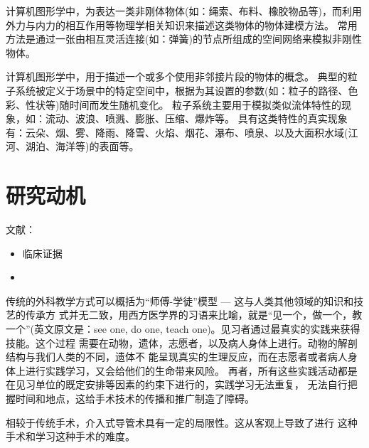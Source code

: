 \begin{definition}[形变模型]
计算机图形学中，为表达一类非刚体物体(如：绳索、布料、橡胶物品等)，而利用外力与内力的相互作用等物理学相关知识来描述这类物体的物体建模方法。
常用方法是通过一张由相互灵活连接(如：弹簧)的节点所组成的空间网络来模拟非刚性物体\cite{Hearn2004CGBook}。
\end{definition}

\begin{definition}[中心线提取]
\end{definition}

\begin{definition}[状态机]
\end{definition}

\begin{definition}[粒子系统]
计算机图形学中，用于描述一个或多个使用非邻接片段的物体的概念。
典型的粒子系统被定义于场景中的特定空间中，根据为其设置的参数(如：粒子的路径、色彩、性状等)随时间而发生随机变化。
粒子系统主要用于模拟类似流体特性的现象，如：流动、波浪、喷溅、膨胀、压缩、爆炸等。
具有这类特性的真实现象有：云朵、烟、雾、降雨、降雪、火焰、烟花、瀑布、喷泉、以及大面积水域(江河、湖泊、海洋等)的表面等\cite{Hearn2004CGBook}。
\end{definition}

\section{研究动机}
\label{sec1-2}

文献：
\begin{itemize}
  \item 临床证据\cite{Aggarwal2006}
  \item
\end{itemize}

传统的外科教学方式可以概括为“师傅-学徒”模型 --- 这与人类其他领域的知识和技艺的传承方
式并无二致，用西方医学界的习语来比喻，就是“见一个，做一个，教一个”(英文原文是：see
one, do one, teach one)\cite{Dawson1998}。见习者通过最真实的实践来获得技能。这个过程
需要在动物，遗体，志愿者，以及病人身体上进行。动物的解剖结构与我们人类的不同，遗体不
能呈现真实的生理反应，而在志愿者或者病人身体上进行实践学习，又会给他们的生命带来风险\cite{liu2003}。
再者，所有这些实践活动都是在见习单位的既定安排等因素的约束下进行的，实践学习无法重复，
无法自行把握时间和地点，这给手术技术的传播和推广制造了障碍。

相较于传统手术，介入式导管术具有一定的局限性\cite{basdogan2007}。这从客观上导致了进行
这种手术和学习这种手术的难度。


